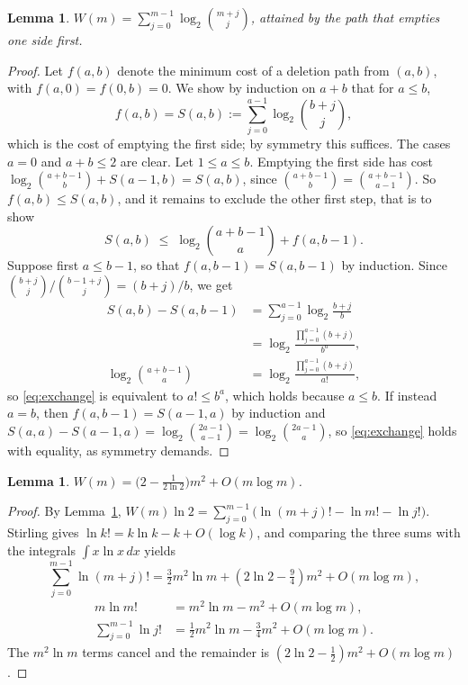\documentclass[11pt]{article}
\newtheorem{lemma}[theorem]{Lemma}
\theoremstyle{definition}
\newcommand{\bin}[2]{\binom{#1}{#2}}
\begin{document}
\begin{lemma}\label{lem:greedy}
$W(m)=\sum_{j=0}^{m-1}\log_2\bin{m+j}{j}$, attained by the path that empties one side first.
\end{lemma}

\begin{proof}
Let $f(a,b)$ denote the minimum cost of a deletion path from $(a,b)$, with $f(a,0)=f(0,b)=0$. We show by induction on $a+b$ that for $a\le b$,
\[
f(a,b)=S(a,b):=\sum_{j=0}^{a-1}\log_2\bin{b+j}{j},
\]
which is the cost of emptying the first side; by symmetry this suffices. The cases $a=0$ and $a+b\le2$ are clear. Let $1\le a\le b$. Emptying the first side has cost $\log_2\bin{a+b-1}{b}+S(a-1,b)=S(a,b)$, since $\bin{a+b-1}{b}=\bin{a+b-1}{a-1}$. So $f(a,b)\le S(a,b)$, and it remains to exclude the other first step, that is to show
\begin{equation}\label{eq:exchange}
S(a,b)\;\le\; \log_2\bin{a+b-1}{a}+f(a,b-1).
\end{equation}
Suppose first $a\le b-1$, so that $f(a,b-1)=S(a,b-1)$ by induction. Since
$\bin{b+j}{j}\big/\bin{b-1+j}{j}=(b+j)/b$, we get
\begin{align*}
S(a,b)-S(a,b-1)
&=\sum_{j=0}^{a-1}\log_2\frac{b+j}{b}\\
&=\log_2\frac{\prod_{j=0}^{a-1}(b+j)}{b^{a}},\\
\log_2\bin{a+b-1}{a}
&=\log_2\frac{\prod_{j=0}^{a-1}(b+j)}{a!},
\end{align*}
so \eqref{eq:exchange} is equivalent to $a!\le b^{a}$, which holds because $a\le b$. If instead $a=b$, then $f(a,b-1)=S(a-1,a)$ by induction and
$S(a,a)-S(a-1,a)=\log_2\bin{2a-1}{a-1}=\log_2\bin{2a-1}{a}$, so \eqref{eq:exchange} holds with equality, as symmetry demands.
\end{proof}

\begin{lemma}\label{lem:W}
$W(m)=\big(2-\tfrac{1}{2\ln 2}\big)m^2+O(m\log m)$.
\end{lemma}

\begin{proof}
By Lemma~\ref{lem:greedy}, $W(m)\ln 2=\sum_{j=0}^{m-1}\big(\ln (m+j)!-\ln m!-\ln j!\big)$. Stirling gives $\ln k!=k\ln k-k+O(\log k)$, and comparing the three sums with the integrals $\int x\ln x\,dx$ yields
\[
\sum_{j=0}^{m-1}\ln(m+j)!=\tfrac32m^2\ln m+(2\ln 2-\tfrac94)m^2+O(m\log m),
\]
\begin{align*}
m\ln m!&=m^2\ln m-m^2+O(m\log m),\\
\sum_{j=0}^{m-1}\ln j!&=\tfrac12m^2\ln m-\tfrac34m^2+O(m\log m).
\end{align*}
The $m^2\ln m$ terms cancel and the remainder is $(2\ln2-\tfrac12)m^2+O(m\log m)$.
\end{proof}
\end{document}
